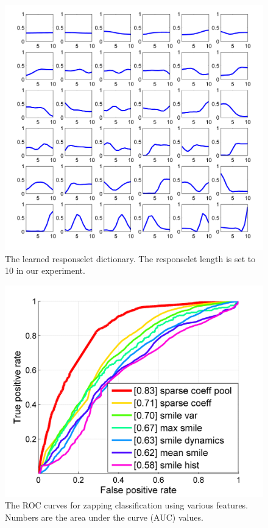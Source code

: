 \documentclass[twoside,leqno,twocolumn]{article}
\begin{document}
\begin{figure}[h]
	\centering
		\includegraphics[width=1\columnwidth]{fig/dict.png}
	\caption{The learned responselet dictionary. The responselet length is set to 10 in our experiment. }
	\label{fig:dict}
\end{figure}

\begin{figure}[h]
	\centering
		\includegraphics[width=.85\columnwidth]{fig/cls_performance.png}
	\caption{The ROC curves for zapping classification using various features. Numbers are the area under the curve (AUC) values.}
	\label{fig:cls_performance}
\end{figure}
\end{document}
